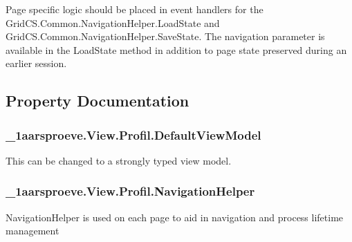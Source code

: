 Page specific logic should be placed in event handlers for the Grid\+C\+S.\+Common.\+Navigation\+Helper.\+Load\+State and Grid\+C\+S.\+Common.\+Navigation\+Helper.\+Save\+State. The navigation parameter is available in the Load\+State method in addition to page state preserved during an earlier session. 

\subsection{Property Documentation}
\hypertarget{class__1aarsproeve_1_1_view_1_1_profil_ad66fb294e243d2475bc5d16da6ddfeb0}{}
\subsubsection[{Default\+View\+Model}]{ \+\_\+1aarsproeve.\+View.\+Profil.\+Default\+View\+Model\hspace{0.3cm}{\ttfamily [get]}}\label{class__1aarsproeve_1_1_view_1_1_profil_ad66fb294e243d2475bc5d16da6ddfeb0}


This can be changed to a strongly typed view model. 

\hypertarget{class__1aarsproeve_1_1_view_1_1_profil_a16410b60470d2871c88c39af75b07130}{}
\subsubsection[{Navigation\+Helper}]{ \+\_\+1aarsproeve.\+View.\+Profil.\+Navigation\+Helper\hspace{0.3cm}{\ttfamily [get]}}\label{class__1aarsproeve_1_1_view_1_1_profil_a16410b60470d2871c88c39af75b07130}


Navigation\+Helper is used on each page to aid in navigation and process lifetime management 



